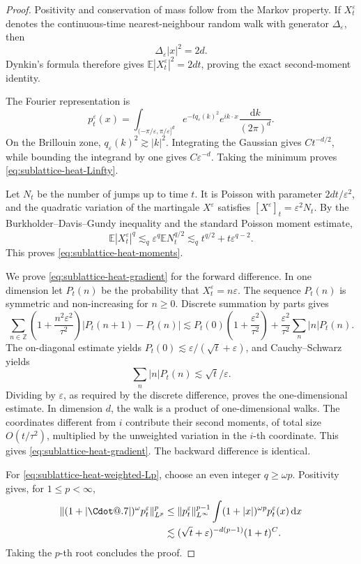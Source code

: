 \documentclass{article}
\makeatletter
\numberwithin{equation}{section}
\newcommand{\mathd}{\mathrm{d}}
\newcommand*\Cdot{{\mathpalette\Cdot@{.7}}}
\newcommand*\Cdot@[2]{\mathbin{\vcenter{\hbox{\scalebox{#2}{\hspace{0.1mm}$\m@th#1\bullet$\hspace{0.1mm}}}}}}
\theoremstyle{plain}
\theoremstyle{definition}
\makeatother
\begin{document}
\begin{proof}
	Positivity and conservation of mass follow from the Markov property.
	If \(X_t^\varepsilon\) denotes the continuous-time nearest-neighbour
	random walk with generator \(\Delta_\varepsilon\), then
	\[
	\Delta_\varepsilon|x|^2=2d.
	\]
	Dynkin's formula therefore gives
	\(\mathbb E|X_t^\varepsilon|^2=2dt\), proving the exact second-moment
	identity.
	
	The Fourier representation is
	\[
	p_t^\varepsilon(x)
	=
	\int_{(-\pi/\varepsilon,\pi/\varepsilon]^d}
	e^{-tq_\varepsilon(k)^2}e^{ik\cdot x}
	\frac{\mathd k}{(2\pi)^d}.
	\]
	On the Brillouin zone,
	\(q_\varepsilon(k)^2\gtrsim|k|^2\).  Integrating the Gaussian gives
	\(Ct^{-d/2}\), while bounding the integrand by one gives
	\(C\varepsilon^{-d}\).  Taking the minimum proves
	\eqref{eq:sublattice-heat-Linfty}.
	
	Let \(N_t\) be the number of jumps up to time \(t\).  It is Poisson with
	parameter \(2dt/\varepsilon^2\), and the quadratic variation of the
	martingale \(X^\varepsilon\) satisfies
	\([X^\varepsilon]_t=\varepsilon^2N_t\).  By the
	Burkholder--Davis--Gundy inequality and the standard Poisson moment
	estimate,
	\[
	\mathbb E|X_t^\varepsilon|^q
	\lesssim_q
	\varepsilon^q\mathbb E N_t^{q/2}
	\lesssim_q
	t^{q/2}+t\varepsilon^{q-2}.
	\]
	This proves \eqref{eq:sublattice-heat-moments}.
	
	We prove \eqref{eq:sublattice-heat-gradient} for the forward difference.
	In one dimension let \(P_t(n)\) be the probability that
	\(X_t^\varepsilon=n\varepsilon\).  The sequence \(P_t(n)\) is symmetric
	and non-increasing for \(n\geq0\).  Discrete summation by parts gives
	\[
	\sum_{n\in\mathbb Z}
	\left(1+\frac{n^2\varepsilon^2}{\tau^2}\right)
	|P_t(n+1)-P_t(n)|
	\lesssim
	P_t(0)\left(1+\frac{\varepsilon^2}{\tau^2}\right)
	+\frac{\varepsilon^2}{\tau^2}
	\sum_n|n|P_t(n).
	\]
	The on-diagonal estimate yields
	\(P_t(0)\lesssim\varepsilon/(\sqrt t+\varepsilon)\), and
	Cauchy--Schwarz yields
	\[\sum_n|n|P_t(n)\lesssim\sqrt t/\varepsilon.\]
	Dividing by \(\varepsilon\), as required by the discrete difference,
	proves the one-dimensional estimate.  In dimension \(d\), the walk is a
	product of one-dimensional walks.  The coordinates different from \(i\)
	contribute their second moments, of total size \(O(t/\tau^2)\), multiplied
	by the unweighted variation in the \(i\)-th coordinate.  This gives
	\eqref{eq:sublattice-heat-gradient}.  The backward difference is identical.
	
	For \eqref{eq:sublattice-heat-weighted-Lp}, choose an even integer
	\(q\geq\omega p\).  Positivity gives, for \(1\leqslant p<\infty\),
	\[
	\begin{aligned}
		\|(1+|\Cdot|)^\omega p_t^\varepsilon\|_{L^p}^p
		&\leq
		\|p_t^\varepsilon\|_{L^\infty}^{p-1}
		\int(1+|x|)^{\omega p}p_t^\varepsilon(x)\,\mathd x
		\\
		&\lesssim
		(\sqrt t+\varepsilon)^{-d(p-1)}(1+t)^C.
	\end{aligned}
	\]
	Taking the \(p\)-th root concludes the proof.
\end{proof}
\end{document}
